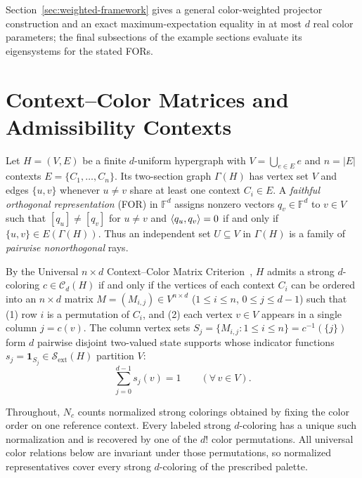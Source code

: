 \documentclass[aps,pra,reprint,superscriptaddress,longbibliography,nofootinbib,floatfix,10pt]{revtex4-2}
\theoremstyle{definition}\newtheorem{definition}[theorem]{Definition}
\theoremstyle{remark}\newtheorem{remark}[theorem]{Remark}
\newcommand{\F}{\mathbb F}\newcommand{\Z}{\mathbb Z}\newcommand{\PP}{\mathbb P}
\newcommand{\Sc}{\mathcal S}\newcommand{\Cc}{\mathcal C}\newcommand{\Wc}{\mathcal W}
\begin{document}
Section~\ref{sec:weighted-framework} gives a general color-weighted projector construction and an exact maximum-expectation equality in at most $d$ real color parameters; the final subsections of the example sections evaluate its eigensystems for the stated FORs.

\section{Context--Color Matrices and Admissibility Contexts}\label{sec:framework}

Let $H=(V,E)$ be a finite $d$-uniform hypergraph with $V=\bigcup_{e\in E}e$ and $n=|E|$ contexts $E=\{C_1,\ldots,C_n\}$. Its two-section graph $\Gamma(H)$ has vertex set $V$ and edges $\{u,v\}$ whenever $u\neq v$ share at least one context $C_i\in E$. A \emph{faithful orthogonal representation} (FOR) in $\F^d$ assigns nonzero vectors $q_v\in\F^d$ to $v\in V$ such that $[q_u]\neq[q_v]$ for $u\neq v$ and $\langle q_u,q_v\rangle=0$ if and only if $\{u,v\}\in E(\Gamma(H))$. Thus an independent set $U\subseteq V$ in $\Gamma(H)$ is a family of \emph{pairwise nonorthogonal} rays.

By the Universal $n\times d$ Context--Color Matrix Criterion~\cite[Theorem~1]{2026-latin-context-matrix}, $H$ admits a strong $d$-coloring $c\in\Cc_d(H)$ if and only if the vertices of each context $C_i$ can be ordered into an $n\times d$ matrix $M=(M_{i,j})\in V^{n\times d}$ ($1\le i\le n$, $0\le j\le d-1$) such that (1) row $i$ is a permutation of $C_i$, and (2) each vertex $v\in V$ appears in a single column $j=c(v)$. The column vertex sets $S_j=\{M_{i,j}:1\le i\le n\}=c^{-1}(\{j\})$ form $d$ pairwise disjoint two-valued state supports whose indicator functions $s_j=\mathbf{1}_{S_j}\in\Sc_{\mathrm{ext}}(H)$ partition $V$:
\begin{equation}\label{eq:color-class-partition}
\sum_{j=0}^{d-1} s_j(v) = 1 \qquad (\forall\, v\in V).
\end{equation}

Throughout, $N_c$ counts normalized strong colorings obtained by fixing the color order on one reference context. Every labeled strong $d$-coloring has a unique such normalization and is recovered by one of the $d!$ color permutations. All universal color relations below are invariant under those permutations, so normalized representatives cover every strong $d$-coloring of the prescribed palette.
\end{document}
